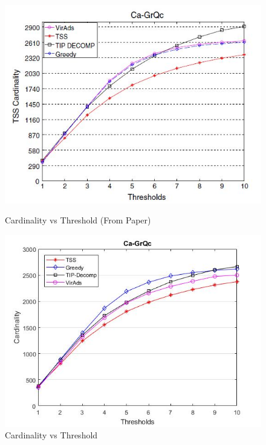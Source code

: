 \begin{figure}[h!]
\begin{minipage}[t]{0.50\textwidth}
\includegraphics[width=\linewidth,keepaspectratio=true]{images/ca-grqcpaper.jpg}
\caption{Cardinality vs Threshold (From Paper)}

\end{minipage}
\begin{minipage}[t]{0.50\textwidth}
\includegraphics[width=\linewidth,keepaspectratio=true]{images/ca-grqcresult.jpg}
\caption{Cardinality vs Threshold}
\end{minipage}
\end{figure}

